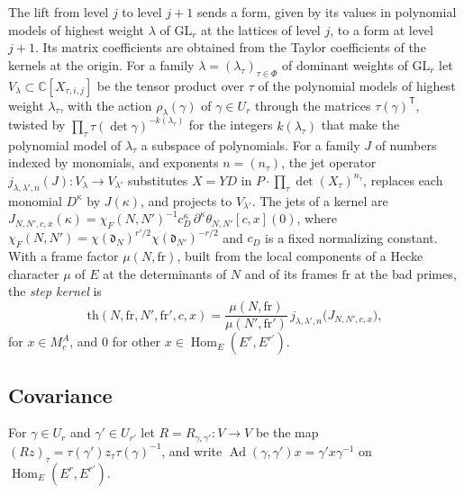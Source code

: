The lift from level $j$ to level $j+1$ sends a form, given by its values in polynomial models of highest weight $\lambda$ of $\mathrm{GL}_r$ at the lattices of level $j$, to a form at level $j+1$. Its matrix coefficients are obtained from the Taylor coefficients of the kernels at the origin. For a family $\lambda=(\lambda_\tau)_{\tau\in\Phi}$ of dominant weights of $\mathrm{GL}_r$ let $V_\lambda\subset\mathbb C[X_{\tau,i,j}]$ be the tensor product over $\tau$ of the polynomial models of highest weight $\lambda_\tau$, with the action $\rho_\lambda(\gamma)$ of $\gamma\in U_r$ through the matrices $\tau(\gamma)^{\mathsf T}$, twisted by $\prod_\tau\tau(\det\gamma)^{-k(\lambda_\tau)}$ for the integers $k(\lambda_\tau)$ that make the polynomial model of $\lambda_\tau$ a subspace of polynomials. For a family $J$ of numbers indexed by monomials, and exponents $n=(n_\tau)$, the jet operator $j_{\lambda,\lambda',n}(J)\colon V_\lambda\to V_{\lambda'}$ substitutes $X=YD$ in $P\cdot\prod_\tau\det(X_\tau)^{n_\tau}$, replaces each monomial $D^\kappa$ by $J(\kappa)$, and projects to $V_{\lambda'}$. The jets of a kernel are $J_{N,N',c,x}(\kappa)=\chi_F(N,N')^{-1}c_D^\kappa\,\partial^\kappa\theta_{N,N'}[c,x](0)$, where $\chi_F(N,N')=\chi(\mathfrak d_N)^{r'/2}\chi(\mathfrak d_{N'})^{-r/2}$ and $c_D$ is a fixed normalizing constant. With a frame factor $\mu(N,\mathrm{fr})$, built from the local components of a Hecke character $\mu$ of $E$ at the determinants of $N$ and of its frames $\mathrm{fr}$ at the bad primes, the \emph{step kernel} is
\begin{equation}\label{stepkernel}
\mathrm{th}(N,\mathrm{fr},N',\mathrm{fr}',c,x)=\frac{\mu(N,\mathrm{fr})}{\mu(N',\mathrm{fr}')}\,j_{\lambda,\lambda',n}\big(J_{N,N',c,x}\big),
\end{equation}
for $x\in M^A_c$, and $0$ for other $x\in\operatorname{Hom}_E(E^r,E^{r'})$.

\subsection{Covariance}\label{sec:covariance}

For $\gamma\in U_r$ and $\gamma'\in U_{r'}$ let $R=R_{\gamma,\gamma'}\colon V\to V$ be the map $(Rz)_\tau=\tau(\gamma')z_\tau\tau(\gamma)^{-1}$, and write $\operatorname{Ad}(\gamma,\gamma')x=\gamma'x\gamma^{-1}$ on $\operatorname{Hom}_E(E^r,E^{r'})$.

